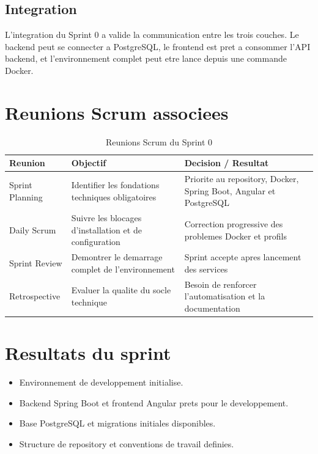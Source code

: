 \documentclass[12pt,a4paper]{report}
\begin{document}
\subsection{Integration}

L'integration du Sprint 0 a valide la communication entre les trois couches. Le backend peut se connecter a PostgreSQL, le frontend est pret a consommer l'API backend, et l'environnement complet peut etre lance depuis une commande Docker.

\section{Reunions Scrum associees}

\begin{table}[H]
\centering
\caption{Reunions Scrum du Sprint 0}
\begin{tabular}{|p{3.5cm}|p{6cm}|p{4cm}|}
\hline
\textbf{Reunion} & \textbf{Objectif} & \textbf{Decision / Resultat} \\
\hline
Sprint Planning & Identifier les fondations techniques obligatoires & Priorite au repository, Docker, Spring Boot, Angular et PostgreSQL \\
\hline
Daily Scrum & Suivre les blocages d'installation et de configuration & Correction progressive des problemes Docker et profils \\
\hline
Sprint Review & Demontrer le demarrage complet de l'environnement & Sprint accepte apres lancement des services \\
\hline
Retrospective & Evaluer la qualite du socle technique & Besoin de renforcer l'automatisation et la documentation \\
\hline
\end{tabular}
\end{table}

\section{Resultats du sprint}

\begin{itemize}[itemsep=0.3em]
    \item Environnement de developpement initialise.
    \item Backend Spring Boot et frontend Angular prets pour le developpement.
    \item Base PostgreSQL et migrations initiales disponibles.
    \item Structure de repository et conventions de travail definies.
\end{itemize}
\end{document}

